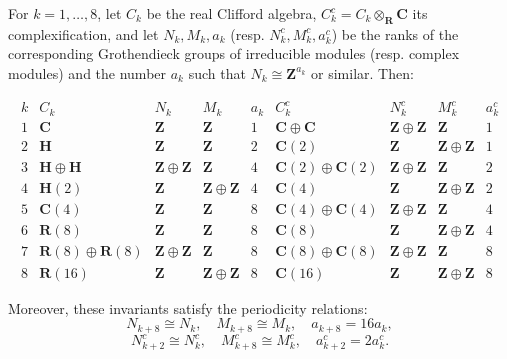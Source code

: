 For $k = 1, \ldots, 8$, let $C_k$ be the real Clifford algebra, $C_k^c = C_k \otimes_{\mathbf{R}} \mathbf{C}$ its complexification, and let $N_k, M_k, a_k$ (resp. $N_k^c, M_k^c, a_k^c$) be the ranks of the corresponding Grothendieck groups of irreducible modules (resp. complex modules) and the number $a_k$ such that $N_k \cong \mathbf{Z}^{a_k}$ or similar. Then:

\[
\begin{array}{c|c|c|c|c|c|c|c|c}
k & C_k & N_k & M_k & a_k & C_k^c & N_k^c & M_k^c & a_k^c \\
\hline
1 & \mathbf{C} & \mathbf{Z} & \mathbf{Z} & 1 & \mathbf{C} \oplus \mathbf{C} & \mathbf{Z} \oplus \mathbf{Z} & \mathbf{Z} & 1 \\
2 & \mathbf{H} & \mathbf{Z} & \mathbf{Z} & 2 & \mathbf{C}(2) & \mathbf{Z} & \mathbf{Z} \oplus \mathbf{Z} & 1 \\
3 & \mathbf{H} \oplus \mathbf{H} & \mathbf{Z} \oplus \mathbf{Z} & \mathbf{Z} & 4 & \mathbf{C}(2) \oplus \mathbf{C}(2) & \mathbf{Z} \oplus \mathbf{Z} & \mathbf{Z} & 2 \\
4 & \mathbf{H}(2) & \mathbf{Z} & \mathbf{Z} \oplus \mathbf{Z} & 4 & \mathbf{C}(4) & \mathbf{Z} & \mathbf{Z} \oplus \mathbf{Z} & 2 \\
5 & \mathbf{C}(4) & \mathbf{Z} & \mathbf{Z} & 8 & \mathbf{C}(4) \oplus \mathbf{C}(4) & \mathbf{Z} \oplus \mathbf{Z} & \mathbf{Z} & 4 \\
6 & \mathbf{R}(8) & \mathbf{Z} & \mathbf{Z} & 8 & \mathbf{C}(8) & \mathbf{Z} & \mathbf{Z} \oplus \mathbf{Z} & 4 \\
7 & \mathbf{R}(8) \oplus \mathbf{R}(8) & \mathbf{Z} \oplus \mathbf{Z} & \mathbf{Z} & 8 & \mathbf{C}(8) \oplus \mathbf{C}(8) & \mathbf{Z} \oplus \mathbf{Z} & \mathbf{Z} & 8 \\
8 & \mathbf{R}(16) & \mathbf{Z} & \mathbf{Z} \oplus \mathbf{Z} & 8 & \mathbf{C}(16) & \mathbf{Z} & \mathbf{Z} \oplus \mathbf{Z} & 8
\end{array}
\]

Moreover, these invariants satisfy the periodicity relations:
$$
N_{k+8} \cong N_k, \quad M_{k+8} \cong M_k, \quad a_{k+8} = 16a_k,
$$
$$
N_{k+2}^c \cong N_k^c, \quad M_{k+8}^c \cong M_k^c, \quad a_{k+2}^c = 2a_k^c.
$$
